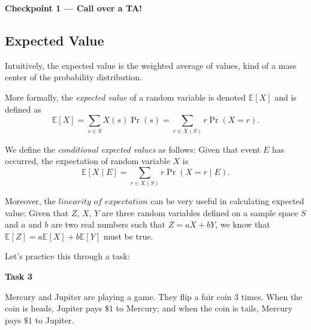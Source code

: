 \documentclass[12pt,letterpaper]{article}
\begin{document}
\textbf{Checkpoint 1 — Call over a TA!}

\newpage
\subsection*{Expected Value}
Intuitively, the expected value is the weighted average of values, kind of a mass center of the probability distribution.

More formally, the \emph{expected value} of a random variable is denoted $\mathbb{E}[X]$ and is defined as 
$$\mathbb{E}[X] = \sum\limits_{s \in S}X(s)\Pr(s)=\sum\limits_{r \in X(S)}r\Pr(X = r).$$

We define the \emph{conditional expected values} as follows:
Given that event $E$ has occurred, the expectation of random variable $X$ is \begin{equation}\label{eq:conditional}
\mathbb{E}[X \mid E]=\sum_{r\in X(S)}r\Pr(X=r\mid E).
\end{equation}

Moreover, the $\textit{linearity of expectation}$ can be very useful in calculating expected value: Given that $Z$, $X$, $Y$ are three random variables defined on a sample space $S$ and $a$ and $b$ are two real numbers such that $Z = aX + bY$, we know that $\mathbb{E}[Z] = a\mathbb{E}[X] + b\mathbb{E}[Y]$ must be true.

Let's practice this through a task:

\textbf{Task 3}

Mercury and Jupiter are playing a game. They flip a fair coin $3$ times. When the coin is heads, Jupiter pays $\$1$ to Mercury; and when the coin is tails, Mercury pays $\$1$ to Jupiter.
\end{document}
